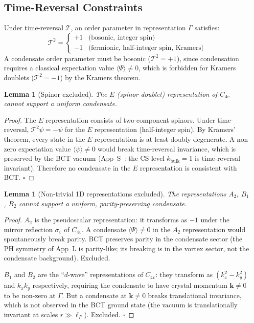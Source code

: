 \documentclass[11pt,a4paper]{article}
\theoremstyle{bctthm}
\newtheorem{lemma}[theorem]{Lemma}
\theoremstyle{definition}
\begin{document}
\subsection{Time-Reversal Constraints}

Under time-reversal $\mathcal{T}$, an order parameter in representation
$\Gamma$ satisfies:
\begin{equation}
\mathcal{T}^2 = \begin{cases} +1 & \text{(bosonic, integer spin)}\\
-1 & \text{(fermionic, half-integer spin, Kramers)} \end{cases}
\end{equation}
A condensate order parameter must be bosonic ($\mathcal{T}^2 = +1$),
since condensation requires a classical expectation value
$\langle\Psi\rangle \neq 0$, which is forbidden for Kramers
doublets ($\mathcal{T}^2 = -1$) by the Kramers theorem.

\begin{lemma}[Spinor excluded]\label{lem:spinor}
The $E$ (spinor doublet) representation of $C_{4v}$ cannot support
a uniform condensate.
\end{lemma}
\begin{proof}
The $E$ representation consists of two-component spinors.
Under time-reversal, $\mathcal{T}^2\psi = -\psi$ for the $E$
representation (half-integer spin). By Kramers' theorem,
every state in the $E$ representation is at least doubly degenerate.
A non-zero expectation value $\langle\psi\rangle \neq 0$
would break time-reversal invariance, which is preserved by
the BCT vacuum (App~S~\cite{monograph}: the CS level $k_\mathrm{bulk} = 1$
is time-reversal invariant). Therefore no condensate in the $E$
representation is consistent with BCT. $\square$
\end{proof}

\begin{lemma}[Non-trivial 1D representations excluded]\label{lem:1d}
The representations $A_2$, $B_1$, $B_2$ cannot support a
uniform, parity-preserving condensate.
\end{lemma}
\begin{proof}
$A_2$ is the pseudoscalar representation: it transforms as
$-1$ under the mirror reflection $\sigma_v$ of $C_{4v}$.
A condensate $\langle\Psi\rangle \neq 0$ in the $A_2$
representation would spontaneously break parity. BCT
preserves parity in the condensate sector (the PH symmetry
of App~L is parity-like; its breaking is in the vortex sector,
not the condensate background). Excluded.

$B_1$ and $B_2$ are the ``$d$-wave'' representations of $C_{4v}$:
they transform as $(k_x^2 - k_y^2)$ and $k_x k_y$ respectively,
requiring the condensate to have crystal momentum
$\mathbf{k} \neq 0$ to be non-zero at $\Gamma$. But a condensate
at $\mathbf{k} \neq 0$ breaks translational invariance, which
is not observed in the BCT ground state (the vacuum is translationally
invariant at scales $r \gg \ell_P$). Excluded. $\square$
\end{proof}
\end{document}
